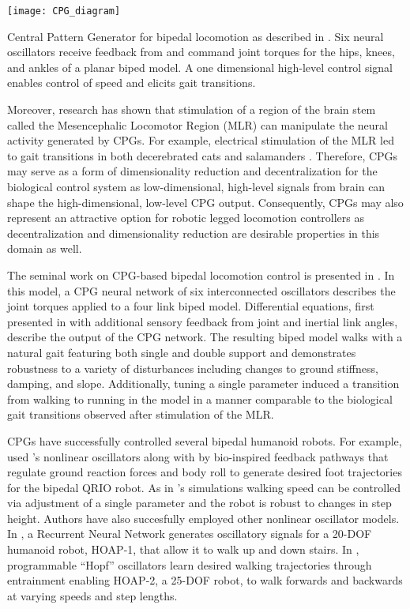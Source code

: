 \begin{marginfigure}
    \centering
    \texttt{[image: CPG\_diagram]}
    \caption{Central Pattern Generator for bipedal locomotion as described in
    \citet{taga1991self}. Six neural oscillators receive feedback from and
    command joint torques for the hips, knees, and ankles of a planar biped
    model. A one dimensional high-level control signal enables control of speed
    and elicits gait transitions.}
    \label{fig:cpg_diagram}
\end{marginfigure}
Moreover, research has shown that stimulation of a region of the brain stem
called the Mesencephalic Locomotor Region (MLR) can manipulate the neural
activity generated by CPGs. For example, electrical stimulation of the MLR led
to gait transitions in both decerebrated cats \citep{shik1966control} and
salamanders \citep{cabelguen2003bimodal}.  Therefore, CPGs may serve as a form
of dimensionality reduction and decentralization for the biological control
system as low-dimensional, high-level signals from brain can shape the
high-dimensional, low-level CPG output. Consequently, CPGs may also represent
an attractive option for robotic legged locomotion controllers as
decentralization and dimensionality reduction are desirable properties in this
domain as well.

The seminal work on CPG-based bipedal locomotion control is presented in
\citet{taga1991self}. In this model, a CPG neural network of six interconnected
oscillators describes the joint torques applied to a four link biped model.
Differential equations, first presented in \citet{matsuoka1987mechanisms} with
additional sensory feedback from joint and inertial link angles, describe the
output of the CPG network. The resulting biped model walks with a natural gait
featuring both single and double support and demonstrates robustness to a
variety of disturbances including changes to ground stiffness, damping, and
slope. Additionally, tuning a single parameter induced a transition from walking
to running in the model in a manner comparable to the biological gait
transitions observed after stimulation of the MLR.

CPGs have successfully controlled several bipedal humanoid robots. For example,
\citet{endo2005experimental} used \citeauthor{matsuoka1987mechanisms}'s
nonlinear oscillators along with by bio-inspired feedback pathways that regulate
ground reaction forces and body roll to generate desired foot trajectories for
the bipedal QRIO robot. As in \citeauthor{taga1991self}'s simulations walking
speed can be controlled via adjustment of a single parameter and the robot is
robust to changes in step height. Authors have also succesfully employed other
nonlinear oscillator models. In \citet{shan2002neural}, a Recurrent Neural
Network generates oscillatory signals for a 20-DOF humanoid robot, HOAP-1, that
allow it to walk up and down stairs. In \citet{righetti2006programmable},
programmable ``Hopf'' oscillators \citep{righetti2006dynamic} learn desired
walking trajectories through entrainment enabling HOAP-2, a 25-DOF robot, to
walk forwards and backwards at varying speeds and step lengths.  

